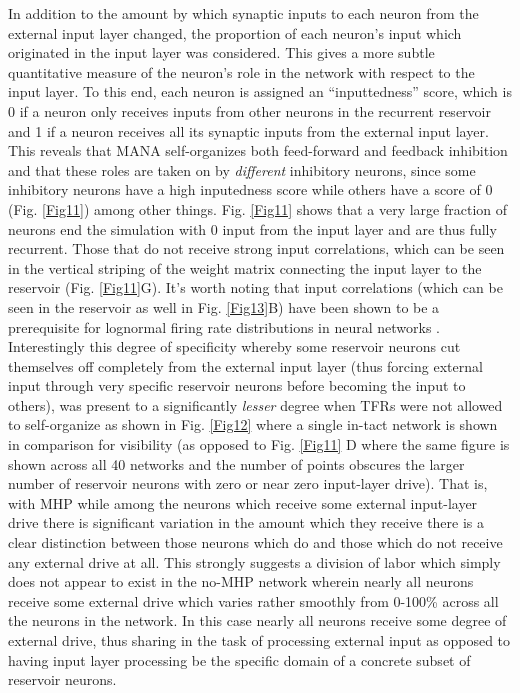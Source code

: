 \documentclass[10pt,letterpaper]{article}
\begin{document}
In addition to the amount by which synaptic inputs to each neuron from the external input layer changed, the proportion of each neuron's input which originated in the input layer was considered. This gives a more subtle quantitative measure of the neuron's role in the network with respect to the input layer. To this end, each neuron is assigned an ``inputtedness'' score, which is 0 if a neuron only receives inputs from other neurons in the recurrent reservoir and 1 if a neuron receives all its synaptic inputs from the external input layer. This reveals that MANA self-organizes both feed-forward and feedback inhibition and that these roles are taken on by \emph{different} inhibitory neurons, since some inhibitory neurons have a high inputedness score while others have a score of 0 (Fig. \ref{Fig11}) among other things. Fig. \ref{Fig11} shows that a very large fraction of neurons end the simulation with 0 input from the input layer and are thus fully recurrent. Those that do not receive strong input correlations, which can be seen in the vertical striping of the weight matrix connecting the input layer to the reservoir (Fig. \ref{Fig11}G). It's worth noting that input correlations (which can be seen in the reservoir as well in Fig. \ref{Fig13}B) have been shown to be a prerequisite for lognormal firing rate distributions in neural networks \cite{koulakov2009correlated}. Interestingly this degree of specificity whereby some reservoir neurons cut themselves off completely from the external input layer (thus forcing external input through very specific reservoir neurons before becoming the input to others), was present to a significantly \emph{lesser} degree when TFRs were not allowed to self-organize as shown in Fig. \ref{Fig12} where a single in-tact network is shown in comparison for visibility (as opposed to Fig. \ref{Fig11} D where the same figure is shown across all 40 networks and the number of points obscures the larger number of reservoir neurons with zero or near zero input-layer drive). That is, with MHP while among the neurons which receive some external input-layer drive there is significant variation in the amount which they receive there is a clear distinction between those neurons which do and those which do not receive any external drive at all. This strongly suggests a division of labor which simply does not appear to exist in the no-MHP network wherein nearly all neurons receive some external drive which varies rather smoothly from 0-100\% across all the neurons in the network. In this case nearly all neurons receive some degree of external drive, thus sharing in the task of processing external input as opposed to having input layer processing be the specific domain of a concrete subset of reservoir neurons. 
\end{document}
